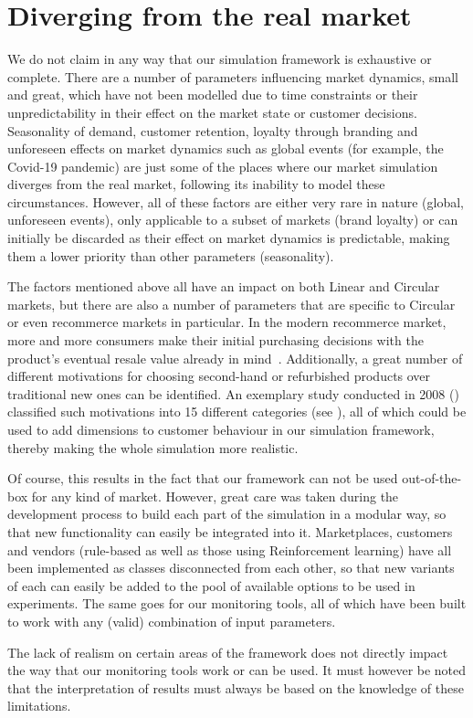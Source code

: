 \section{Diverging from the real market}\label{sec:DivergingFromRealMarket}

We do not claim in any way that our simulation framework is exhaustive or complete. There are a number of parameters influencing market dynamics, small and great, which have not been modelled due to time constraints or their unpredictability in their effect on the market state or customer decisions. Seasonality of demand, customer retention, loyalty through branding and unforeseen effects on market dynamics such as global events (for example, the Covid-19 pandemic) are just some of the places where our market simulation diverges from the real market, following its inability to model these circumstances. However, all of these factors are either very rare in nature (global, unforeseen events), only applicable to a subset of markets (brand loyalty) or can initially be discarded as their effect on market dynamics is predictable, making them a lower priority than other parameters (seasonality).

The factors mentioned above all have an impact on both Linear and Circular markets, but there are also a number of parameters that are specific to Circular or even recommerce markets in particular. In the modern recommerce market, more and more consumers make their initial purchasing decisions with the product's eventual resale value already in mind~\cite{ShoppingResaleValue}. Additionally, a great number of different motivations for choosing second-hand or refurbished products over traditional new ones can be identified. An exemplary study conducted in 2008 (\cite{SecondHandMotives}) classified such motivations into 15 different categories (see ), all of which could be used to add dimensions to customer behaviour in our simulation framework, thereby making the whole simulation more realistic.

Of course, this results in the fact that our framework can not be used out-of-the-box for any kind of market. However, great care was taken during the development process to build each part of the simulation in a modular way, so that new functionality can easily be integrated into it. Marketplaces, customers and vendors (rule-based as well as those using Reinforcement learning) have all been implemented as classes disconnected from each other, so that new variants of each can easily be added to the pool of available options to be used in experiments. The same goes for our monitoring tools, all of which have been built to work with any (valid) combination of input parameters.

The lack of realism on certain areas of the framework does not directly impact the way that our monitoring tools work or can be used. It must however be noted that the interpretation of results must always be based on the knowledge of these limitations.
